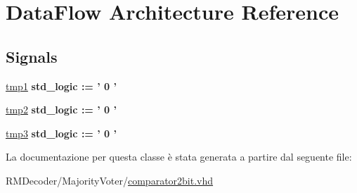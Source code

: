 \hypertarget{classcomparator2bit_1_1_data_flow}{\section{Data\+Flow Architecture Reference}
\label{classcomparator2bit_1_1_data_flow}
}
\subsection*{Signals}
 \begin{DoxyCompactItemize}
\item 
\hypertarget{classcomparator2bit_1_1_data_flow_ga052a90adf60bb3fc0352fc16b4d22cc6}{\hyperlink{group___majority_voter_ga052a90adf60bb3fc0352fc16b4d22cc6}{tmp1} {\bfseries \textcolor{vhdlchar}{std\+\_\+logic}\textcolor{vhdlchar}{ }\textcolor{vhdlchar}{ }\textcolor{vhdlchar}{\+:}\textcolor{vhdlchar}{=}\textcolor{vhdlchar}{ }\textcolor{vhdlchar}{ }\textcolor{vhdlchar}{'}\textcolor{vhdlchar}{ } \textcolor{vhdldigit}{0} \textcolor{vhdlchar}{ }\textcolor{vhdlchar}{'}\textcolor{vhdlchar}{ }} }\label{classcomparator2bit_1_1_data_flow_ga052a90adf60bb3fc0352fc16b4d22cc6}

\item 
\hypertarget{classcomparator2bit_1_1_data_flow_gaa2bb8e3a49b58e114167a4a35318f363}{\hyperlink{group___majority_voter_gaa2bb8e3a49b58e114167a4a35318f363}{tmp2} {\bfseries \textcolor{vhdlchar}{std\+\_\+logic}\textcolor{vhdlchar}{ }\textcolor{vhdlchar}{ }\textcolor{vhdlchar}{\+:}\textcolor{vhdlchar}{=}\textcolor{vhdlchar}{ }\textcolor{vhdlchar}{ }\textcolor{vhdlchar}{'}\textcolor{vhdlchar}{ } \textcolor{vhdldigit}{0} \textcolor{vhdlchar}{ }\textcolor{vhdlchar}{'}\textcolor{vhdlchar}{ }} }\label{classcomparator2bit_1_1_data_flow_gaa2bb8e3a49b58e114167a4a35318f363}

\item 
\hypertarget{classcomparator2bit_1_1_data_flow_ga9f50761ba7cfe80836abd801ef32b402}{\hyperlink{group___majority_voter_ga9f50761ba7cfe80836abd801ef32b402}{tmp3} {\bfseries \textcolor{vhdlchar}{std\+\_\+logic}\textcolor{vhdlchar}{ }\textcolor{vhdlchar}{ }\textcolor{vhdlchar}{\+:}\textcolor{vhdlchar}{=}\textcolor{vhdlchar}{ }\textcolor{vhdlchar}{ }\textcolor{vhdlchar}{'}\textcolor{vhdlchar}{ } \textcolor{vhdldigit}{0} \textcolor{vhdlchar}{ }\textcolor{vhdlchar}{'}\textcolor{vhdlchar}{ }} }\label{classcomparator2bit_1_1_data_flow_ga9f50761ba7cfe80836abd801ef32b402}

\end{DoxyCompactItemize}


La documentazione per questa classe è stata generata a partire dal seguente file\+:\begin{DoxyCompactItemize}
\item 
R\+M\+Decoder/\+Majority\+Voter/\hyperlink{comparator2bit_8vhd}{comparator2bit.\+vhd}\end{DoxyCompactItemize}
